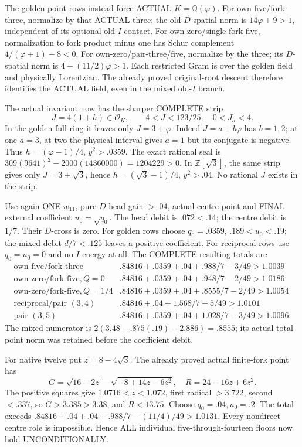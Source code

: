 The golden point rows instead force
ACTUAL \(K=\mathbb Q(\varphi)\).
For own-five/fork-three, normalize by
that ACTUAL three; the old-\(D\) spatial
norm is \(14\varphi+9>1\), independent
of its optional old-\(I\) contact.
For own-zero/single-fork-five, normalization
to fork product minus one has
Schur complement \(4/(\varphi+1)-8<0\).
For own-zero/pair-three/five, normalize
by the three; its \(D\)-spatial norm
is \(4+(11/2)\varphi>1\).
Each restricted Gram is over the golden
field and physically Lorentzian.
The already proved original-root descent
therefore identifies the ACTUAL field,
even in the mixed old-\(I\) branch.

The actual invariant now has the
sharper COMPLETE strip
\[
                   J=4(1+h)\in\mathcal O_K,\qquad
                   4<J<123/25,\quad0<J_\sigma<4 .
\tag{D16IJ}\label{eq:arithD16Istrip}
\]
In the golden full ring it leaves only
\(J=3+\varphi\).
Indeed \(J=a+b\varphi\) has \(b=1,2\);
at one \(a=3\), at two the physical
interval gives \(a=1\) but its conjugate
is negative.
Thus \(h=(\varphi-1)/4\), \(y^2>.0359\).
The exact rational seal is
\(309(9641)^2-2000(14360000)=1204229>0\).
In \(\mathbb Z[\sqrt3]\), the same strip
gives only \(J=3+\sqrt3\), hence
\(h=(\sqrt3-1)/4\), \(y^2>.04\).
No rational \(J\) exists in the strip.

Use again ONE \(w_{11}\), pure-\(D\)
head gain \(>.04\), actual centre point
and FINAL external coefficient
\(u_0=\sqrt{q_0}\).
The head debit is \(.072<.14\);
the centre debit is \(1/7\).
Their \(D\)-cross is zero.
For golden rows choose \(q_0=.0359\),
\(.189<u_0<.19\); the mixed debit
\(d/7<.125\) leaves a positive coefficient.
For reciprocal rows use \(q_0=u_0=0\)
and no \(I\) energy at all.
The COMPLETE resulting totals are
\[
\begin{array}{c|l}
 \text{own-five/fork-three}&
 .84816+.0359+.04+.988/7-3/49>1.0039\\
 \text{own-zero/fork-five},Q=0&
 .84816+.0359+.04+.948/7-2/49>1.0186\\
 \text{own-zero/fork-five},Q=1/4&
 .84816+.0359+.04+.8555/7-2/49>1.0054\\
 \text{reciprocal/pair }(3,4)&
 .84816+.04+1.568/7-5/49>1.0101\\
 \text{pair }(3,5)&
 .84816+.0359+.04+1.028/7-3/49>1.0096 .
\end{array}
\]
The mixed numerator is
\(2(3.48-.875(.19)-2.886)=.8555\);
its actual total point norm was
retained before the coefficient debit.

For native twelve put \(z=8-4\sqrt3\).
The already proved actual finite-fork
point has
\[
 G=\sqrt{16-2z}-\sqrt{-8+14z-6z^2},\quad
                         R=24-16z+6z^2 .
\]
The positive squares give
\(1.0716<z<1.072\), first radical
\(>3.722\), second \(<.337\), so
\(G>3.385>3.38\), and \(R<13.75\).
Choose \(q_0=.04,u_0=.2\).
The total exceeds
\(.84816+.04+.04+.988/7-(11/4)/49>1.0131\).
Every nondirect centre role is impossible.
Hence ALL individual five-through-fourteen
floors now hold UNCONDITIONALLY.

